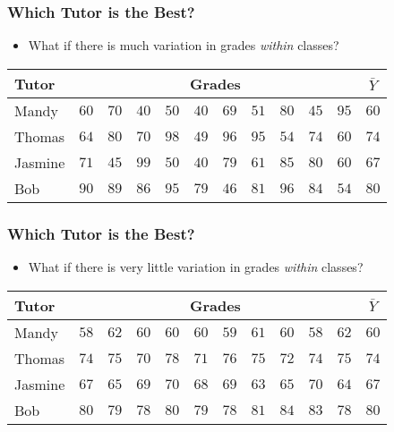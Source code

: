 \documentclass[12pt]{beamer}
\begin{document}
\begin{frame}
	\frametitle{Which Tutor is the Best?}
	
	\begin{itemize}[label={\color{blue}$\blacktriangleright$}]
		\item What if there is much variation in grades \textit{within} classes?
	\end{itemize}
	
	\vspace{0.5em}
	
	\begin{center}
		\small
		\begin{tabular}{l*{10}{c}c}
			\hline
			Tutor & \multicolumn{10}{c}{Grades} & $\bar{Y}$ \\
			\hline
			Mandy & $60$ & $70$ & $40$ & $50$ & $40$ & $69$ & $51$ & $80$ & $45$ & $95$ & $60$ \\
			Thomas & $64$ & $80$ & $70$ & $98$ & $49$ & $96$ & $95$ & $54$ & $74$ & $60$ & $74$ \\
			Jasmine & $71$ & $45$ & $99$ & $50$ & $40$ & $79$ & $61$ & $85$ & $80$ & $60$ & $67$ \\
			Bob & $90$ & $89$ & $86$ & $95$ & $79$ & $46$ & $81$ & $96$ & $84$ & $54$ & $80$ \\
			\hline
		\end{tabular}
	\end{center}
	
\end{frame}
\begin{frame}
	\frametitle{Which Tutor is the Best?}
	
	\begin{itemize}[label={\color{blue}$\blacktriangleright$}]
		\item What if there is very little variation in grades \textit{within} classes?
	\end{itemize}
	
	\vspace{0.5em}
	
	\begin{center}
		\small
		\begin{tabular}{l*{10}{c}c}
			\hline
			Tutor & \multicolumn{10}{c}{Grades} & $\bar{Y}$ \\
			\hline
			Mandy & $58$ & $62$ & $60$ & $60$ & $60$ & $59$ & $61$ & $60$ & $58$ & $62$ & $60$ \\
			Thomas & $74$ & $75$ & $70$ & $78$ & $71$ & $76$ & $75$ & $72$ & $74$ & $75$ & $74$ \\
			Jasmine & $67$ & $65$ & $69$ & $70$ & $68$ & $69$ & $63$ & $65$ & $70$ & $64$ & $67$ \\
			Bob & $80$ & $79$ & $78$ & $80$ & $79$ & $78$ & $81$ & $84$ & $83$ & $78$ & $80$ \\
			\hline
		\end{tabular}
	\end{center}
	
\end{frame}
\end{document}
